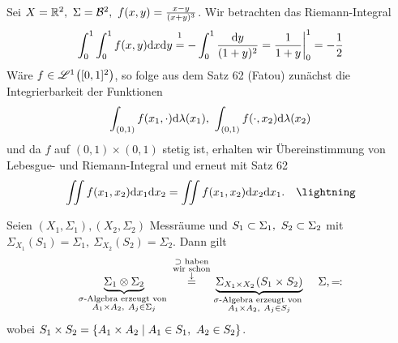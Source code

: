 \documentclass[skript.tex]{subfiles}
\begin{document}
	\setcounter{cntr}{62}
	\begin{bsp}
		Sei $X=\mathbb{R}^2,\ \Sigma = \mathcal{B}^2,\ f(x,y)=\frac{x-y}{(x+y)^3}$. Wir betrachten das Riemann-Integral
		\[
			\int_0^1 \int_0^1 f(x,y) \md x \md y \stackrel{\footnotemark}{=} - \int_0^1 \frac{\md y}{(1+y)^2} = \frac{1}{1+y} \bigg\vert_0^1 = -\frac{1}{2}
		\] 
		Wäre $f\in \mathscr{L}^1\pr{[0,1]^2}$, so folge aus dem \textup{Satz 62 (Fatou)} zunächst die Integrierbarkeit der Funktionen
		\[
			\int_{(0,1)} f(x_1,\cdot) \mathrm{d} \lambda(x_1),\ \int_{(0,1)} f(\cdot, x_2) \mathrm{d} \lambda(x_2) 
		\]
		und da $f$ auf $(0,1)\times(0,1)$ stetig ist, erhalten wir Übereinstimmung von Lebesgue- und Riemann-Integral und erneut mit \textup{Satz 62}
		\[
			\iint f(x_1, x_2) \md x_1 \md x_2 = \iint f(x_1, x_2) \md x_2 \md x_1. \quad \lightning %
		\]
	\end{bsp}
	
	\begin{lem}
		Seien $(X_1, \Sigma_1),(X_2, \Sigma_2)$ Messräume und $S_1 \subset \Sigma_1,\ S_2 \subset \Sigma_2$ mit\\ $\Sigma_{X_1}(S_1) = \Sigma_1,\ \Sigma_{X_2}(S_2) = \Sigma_2$. Dann gilt
		\[
			\underbrace{\Sigma_1 \otimes \Sigma_2}_{\substack{\sigma\text{-Algebra erzeugt von }\\ A_1\times A_2,\ A_j \in \Sigma_j}} \stackrel{\substack{\supset \text{ haben} \\ \text{wir schon} \\ \downarrow}}{=} \underbrace{\Sigma_{X_1 \times X_2}\pr{S_1 \times S_2}}_{\substack{\sigma\text{-Algebra erzeugt von }\\ A_1\times A_2,\ A_j \in S_j}}\quad \Sigma , \mathrm{\rotatebox[origin=c]{180}{$\ceq$}}
		\]
		wobei $S_1 \times S_2 = \left\{A_1 \times A_2 \mid A_1 \in S_1,\ A_2 \in S_2\right\}$.
	\end{lem}
	
\end{document}
